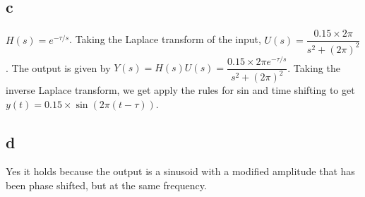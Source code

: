 \documentclass[11pt]{article}
\begin{document}
\subsection{c}

$H(s) = e^{-\tau / s}$. Taking the Laplace transform of the input, $U(s) = \dfrac{0.15 \times 2 \pi}{s^2 + (2\pi)^2}$. The output is given by $Y(s) = H(s) U(s) = \dfrac{0.15 \times 2 \pi e^{-\tau / s}}{s^2 + (2\pi)^2}$. Taking the inverse Laplace transform, we get apply the rules for sin and time shifting to get $y(t) = 0.15 \times \sin (2\pi (t - \tau))$.

\subsection{d}

Yes it holds because the output is a sinusoid with a modified amplitude that has been phase shifted, but at the same frequency.
\end{document}
